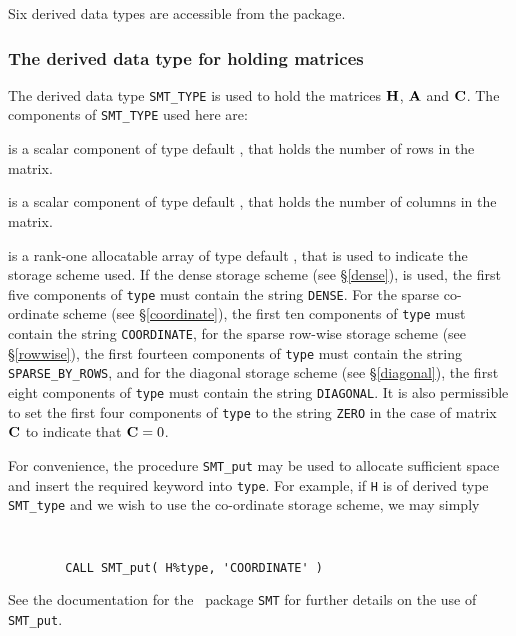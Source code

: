 \documentclass{galahad}
\begin{document}

\galtypes
Six derived data types are accessible from the package.


\subsubsection{The derived data type for holding matrices}\label{typesmt}
The derived data type {\tt SMT\_TYPE} is used to hold the matrices ${\mathbf{H}}$,
${\mathbf{A}}$ and ${\mathbf{C}}$. The components of {\tt SMT\_TYPE} used here are:

\begin{description}

 is a scalar component of type default \integer,
that holds the number of rows in the matrix.

 is a scalar component of type default \integer,
that holds the number of columns in the matrix.

 is a rank-one allocatable array of type default \character, that
is used to indicate the storage scheme used. If the dense storage scheme
(see \S\ref{dense}), is used,
the first five components of {\tt type} must contain the
string {\tt DENSE}.
For the sparse co-ordinate scheme (see \S\ref{coordinate}),
the first ten components of {\tt type} must contain the
string {\tt COORDINATE},
for the sparse row-wise storage scheme (see \S\ref{rowwise}),
the first fourteen components of {\tt type} must contain the
string {\tt SPARSE\_BY\_ROWS},
and for the diagonal storage scheme (see \S\ref{diagonal}),
the first eight components of {\tt type} must contain the
string {\tt DIAGONAL}. It is also permissible to set
the first four components of {\tt type} to the string
{\tt ZERO} in the case of matrix ${\mathbf{C}}$ to indicate that ${\mathbf{C}} = 0$.

For convenience, the procedure {\tt SMT\_put}
may be used to allocate sufficient space and insert the required keyword
into {\tt type}.
For example, if {\tt H} is of derived type {\tt SMT\_type}
and we wish to use the co-ordinate storage scheme, we may simply
{\tt
\begin{verbatim}
        CALL SMT_put( H%type, 'COORDINATE' )
\end{verbatim}
}
\noindent
See the documentation for the \galahad\ package {\tt SMT}
for further details on the use of {\tt SMT\_put}.


\end{description}
\end{document}

